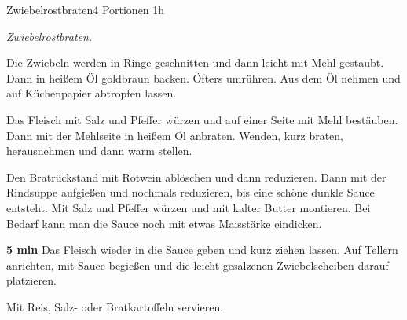 \documentclass[../recipe-collections/cooking.tex]{subfiles}
\begin{document}
\begin{recipe}{Zwiebelrostbraten}{4 Portionen }{1h }

  \freeform{}\textit{Zwiebelrostbraten.}


  Die Zwiebeln werden in Ringe geschnitten und dann leicht mit Mehl gestaubt.
  Dann in heißem Öl goldbraun backen.
  Öfters umrühren.
  Aus dem Öl nehmen und auf Küchenpapier abtropfen lassen.


  Das Fleisch mit Salz und Pfeffer würzen und auf einer Seite mit Mehl bestäuben.
  Dann mit der Mehlseite in heißem Öl anbraten.
  Wenden, kurz braten, herausnehmen und dann warm stellen.


  Den Bratrückstand mit Rotwein ablöschen und dann reduzieren.
  Dann mit der Rindsuppe aufgießen und nochmals reduzieren, bis eine schöne dunkle Sauce entsteht.
  Mit Salz und Pfeffer würzen und mit kalter Butter montieren.
  Bei Bedarf kann man die Sauce noch mit etwas Maisstärke eindicken.

  \newstep{}\textbf{5 min}
  Das Fleisch wieder in die Sauce geben und kurz ziehen lassen.
  Auf Tellern anrichten, mit Sauce begießen und die leicht gesalzenen Zwiebelscheiben darauf platzieren.

  \freeform{}\hrulefill{}

  \freeform{}
  Mit Reis, Salz- oder Bratkartoffeln servieren.

\end{recipe}
\end{document}

